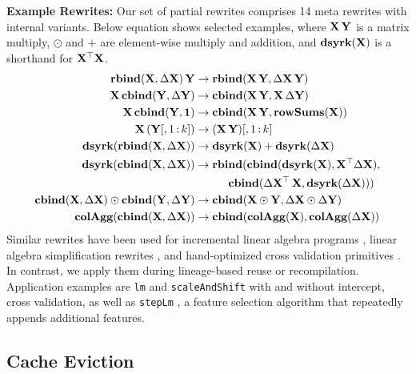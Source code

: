 \textbf{Example Rewrites:} Our set of partial rewrites comprises 14 meta rewrites with internal variants. Below equation shows selected examples, where $\mathbf{X}\,\mathbf{Y}$ is a matrix multiply, $\odot$ and $+$ are element-wise multiply and addition, and $\textbf{dsyrk}(\mathbf{X})$ is a shorthand for $\mathbf{X}^{\top}\mathbf{X}$.
\[\begin{split}
\textbf{rbind}(\mathbf{X},\Delta\mathbf{X})\,\mathbf{Y} &\rightarrow \textbf{rbind}(\mathbf{X}\,\mathbf{Y}, \Delta\mathbf{X}\,\mathbf{Y})\\
\mathbf{X}\,\textbf{cbind}(\mathbf{Y},\Delta\mathbf{Y}) &\rightarrow \textbf{cbind}(\mathbf{X}\,\mathbf{Y}, \mathbf{X}\,\Delta\mathbf{Y})\\
\mathbf{X}\,\textbf{cbind}(\mathbf{Y},\mathbf{1}) &\rightarrow \textbf{cbind}(\mathbf{X}\,\mathbf{Y}, \textbf{rowSums}(\mathbf{X}))\\
\mathbf{X}\,(\mathbf{Y}[,1{\,:\,}k]) &\rightarrow (\mathbf{X}\,\mathbf{Y})[,1{\,:\,}k]\\
\textbf{dsyrk}(\textbf{rbind}(\mathbf{X},\Delta\mathbf{X})) & \rightarrow \textbf{dsyrk}(\mathbf{X}) + \textbf{dsyrk}(\Delta\mathbf{X})\\
\textbf{dsyrk}(\textbf{cbind}(\mathbf{X},\Delta\mathbf{X})) & \rightarrow \textbf{rbind}(
	\textbf{cbind}(\textbf{dsyrk}(\mathbf{X}), \mathbf{X}^{\top}\Delta\mathbf{X}),\\
	 &\qquad\quad\textbf{cbind}(\Delta\mathbf{X}^{\top}\,\mathbf{X}, \textbf{dsyrk}(\Delta \mathbf{X})))\\
\textbf{cbind}(\mathbf{X},\Delta\mathbf{X}) \odot \textbf{cbind}(\mathbf{Y},\Delta\mathbf{Y}) &\rightarrow \textbf{cbind}(\mathbf{X}\odot\mathbf{Y},\Delta\mathbf{X}\odot\Delta\mathbf{Y})\\
\textbf{colAgg}(\textbf{cbind}(\mathbf{X}, \Delta\mathbf{X})) &\rightarrow \textbf{cbind}(\textbf{colAgg}(\mathbf{X}), \textbf{colAgg}(\Delta\mathbf{X}))\\
\end{split}\]
Similar rewrites have been used for incremental linear algebra programs \cite{NikolicEK14}, linear algebra simplification rewrites \cite{BoehmBERRSTT14,ElgamalLBETRS17,WangHSHL20,FangSW020,JiaPTWZA19}, and hand-optimized cross validation primitives \cite{KunftKSBRM19}. In contrast, we apply them during lineage-based reuse or recompilation. Application examples are \texttt{lm} and \texttt{scaleAndShift} with and without intercept, cross validation, as well as \texttt{stepLm} \cite{VenablesR02,BoehmADGIKLPR20}, a feature selection algorithm that repeatedly appends additional features.

\subsection{Cache Eviction}
\label{sec:eviction}

